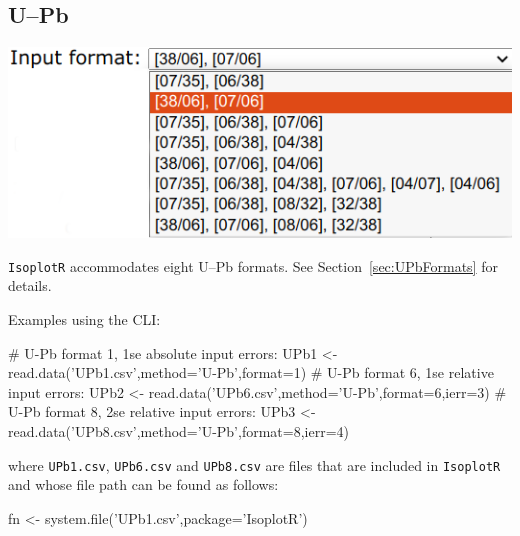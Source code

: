 \begin{refsection}

\chapter{U--Pb}
\label{ch:UPb-R}

\noindent\begin{minipage}[t]{.5\linewidth}
\strut\vspace*{-\baselineskip}\newline
\includegraphics[width=\linewidth]{../figures/UPbFormats.png}\\
\end{minipage}
\begin{minipage}[t]{.5\textwidth}
  \texttt{IsoplotR} accommodates eight U--Pb formats. See
  Section~\ref{sec:UPbFormats} for details.
\end{minipage}

\noindent Examples using the CLI:

\begin{script}
# U-Pb format 1, 1se absolute input errors:
UPb1 <- read.data('UPb1.csv',method='U-Pb',format=1)
# U-Pb format 6, 1se relative input errors:
UPb2 <- read.data('UPb6.csv',method='U-Pb',format=6,ierr=3)
# U-Pb format 8, 2se relative input errors:
UPb3 <- read.data('UPb8.csv',method='U-Pb',format=8,ierr=4)
\end{script}

\noindent where \texttt{UPb1.csv}, \texttt{UPb6.csv} and
\texttt{UPb8.csv} are files that are included in \texttt{IsoplotR} and
whose file path can be found as follows:

\begin{console}
fn <- system.file('UPb1.csv',package='IsoplotR')
\end{console}


\end{refsection}
